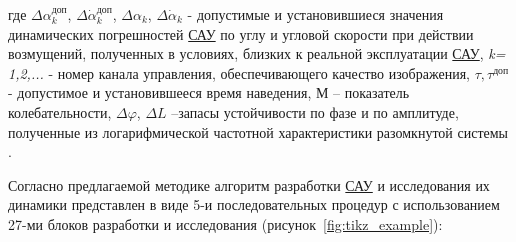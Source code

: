 где $\varDelta \alpha^{\textit{доп}}_{k}$, 
$\varDelta \dot{\alpha}^{\textit{доп}}_{k}$, 
$\varDelta \alpha _k$, 
$\varDelta \dot{\alpha}_k$ 
- допустимые и установившиеся значения динамических погрешностей \hyperref[acroSAU]{САУ} по углу и угловой скорости при действии возмущений, полученных в условиях, близких к реальной эксплуатации \hyperref[acroSAU]{САУ}, \textit{k= 1,2,...} - номер канала управления, обеспечивающего качество изображения, $\tau, \tau^\textit{доп}$ - допустимое и установившееся время наведения, М – показатель колебательности, $\varDelta \varphi$, $\varDelta L$ –запасы устойчивости по фазе и по амплитуде, полученные из логарифмической частотной характеристики разомкнутой системы \cite[]{Bessekerski20}.

Согласно предлагаемой методике алгоритм разработки \hyperref[acroSAU]{САУ} и исследования их динамики представлен в виде 5-и последовательных процедур с использованием 27-ми блоков разработки и исследования (рисунок~\ref{fig:tikz_example}):

